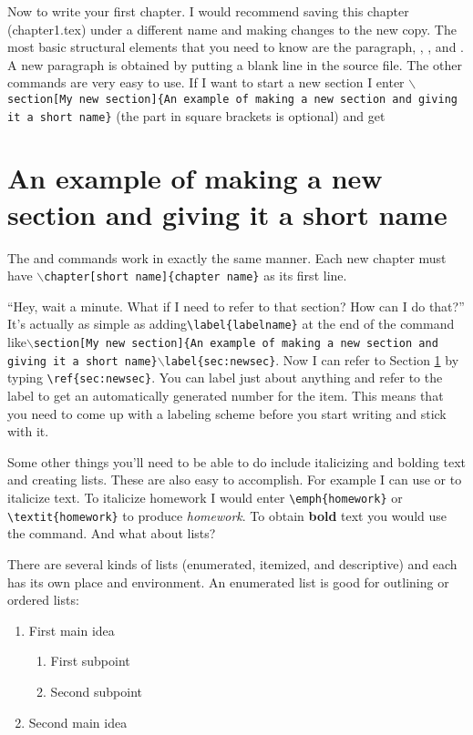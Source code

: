 Now to write your first chapter. I would recommend saving this chapter (chapter1.tex) under a different name and making changes to the new copy. The most basic structural elements that you need to know are the paragraph, , , and . A new paragraph is obtained by putting a blank line in the source file.  The other commands are very easy to use. If I want to start a new section I enter \texttt{$\backslash$section[My new section]\{An example of making a new section and giving it a short name\}} (the part in square brackets is optional) and get

\section[My new section]{An example of making a new section and giving it a short name}\label{sec:newsec}

The  and  commands work in exactly the same manner. Each new chapter must have \texttt{$\backslash$chapter[short name]\{chapter name\}} as its first line.

``Hey, wait a minute. What if I need to refer to that section? How can I do that?'' It's actually as simple as adding\verb+\label{labelname}+ at the end of the  command like\texttt{$\backslash$section[My new section]\{An example of making a new section and giving it a short name\}$\backslash$label\{sec:newsec\}}. Now I can refer to Section \ref{sec:newsec} by typing \verb+\ref{sec:newsec}+. You can label just about anything and refer to the label to get an automatically generated number for the item. This means that you need to come up with a labeling scheme before you start writing and stick with it.

Some other things you'll need to be able to do include italicizing and bolding text and creating lists. These are also easy to accomplish. For example I can use  or  to italicize text. To italicize homework I would enter \verb|\emph{homework}| or \verb|\textit{homework}| to produce \textit{homework}. To obtain \textbf{bold} text you would use the  command. And what about lists?

There are several kinds of lists (enumerated, itemized, and descriptive) and each has its own place and environment. An enumerated list is good for outlining or ordered lists:

\begin{singlespace}
\begin{example}
\begin{enumerate}
\item First main idea
\begin{enumerate}
\item First subpoint
\item\label{enum:1b} Second subpoint
\end{enumerate}
\item Second main idea
\end{enumerate}
\end{example}
\end{singlespace}

